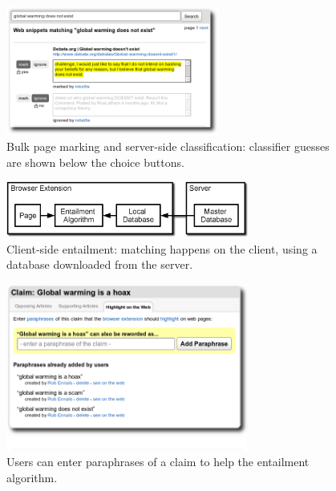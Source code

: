 \documentclass{www2010-accepted}
\begin{document}
\begin{figure}[tb]
	\begin{center}
	\includegraphics[width=7cm]{pictures/training2.png}
	\caption{Bulk page marking and server-side classification: classifier guesses are shown below the choice buttons.}
	\label{training}
	\end{center}
\end{figure}

\begin{figure}[t]
	\begin{center}
	\includegraphics[width=8cm]{pictures/nlp_client_server2.png}
	\caption{Client-side entailment: matching happens on the client, using a database downloaded from the server.}
	\label{nlp_client_server}
	\end{center}
\end{figure}

\begin{figure}[tb]
	\begin{center}
	\includegraphics[width=8cm]{pictures/paraphrases2.png}
	\caption{Users can enter paraphrases of a claim to help the entailment algorithm.}
	\label{paraphrases}
	\end{center}
\end{figure}
\end{document}
